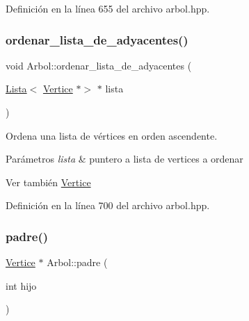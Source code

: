 Definición en la línea 655 del archivo arbol.\+hpp.

\mbox{\label{classArbol_aeb7dff584795382d8e8a1a4694d0ac4e}} 
\subsubsection{\texorpdfstring{ordenar\+\_\+lista\+\_\+de\+\_\+adyacentes()}{ordenar\_lista\_de\_adyacentes()}}
{\footnotesize\ttfamily void Arbol\+::ordenar\+\_\+lista\+\_\+de\+\_\+adyacentes (\begin{DoxyParamCaption}\item[{\hyperlink{classLista}{Lista}$<$ \hyperlink{classVertice}{Vertice} $\ast$$>$ $\ast$}]{lista }\end{DoxyParamCaption})\hspace{0.3cm}{\ttfamily [protected]}}



Ordena una lista de vértices en orden ascendente. 


\begin{DoxyParams}{Parámetros}
{\em lista} & puntero a lista de vertices a ordenar \\
\hline
\end{DoxyParams}
\begin{DoxySeeAlso}{Ver también}
\hyperlink{classVertice}{Vertice} 
\end{DoxySeeAlso}


Definición en la línea 700 del archivo arbol.\+hpp.

\mbox{\label{classArbol_abcb8c26e9021a1418de71ad6014351cf}} 
\subsubsection{\texorpdfstring{padre()}{padre()}\hspace{0.1cm}{\footnotesize\ttfamily [1/3]}}
{\footnotesize\ttfamily \hyperlink{classVertice}{Vertice} $\ast$ Arbol\+::padre (\begin{DoxyParamCaption}\item[{int}]{hijo }\end{DoxyParamCaption})}



